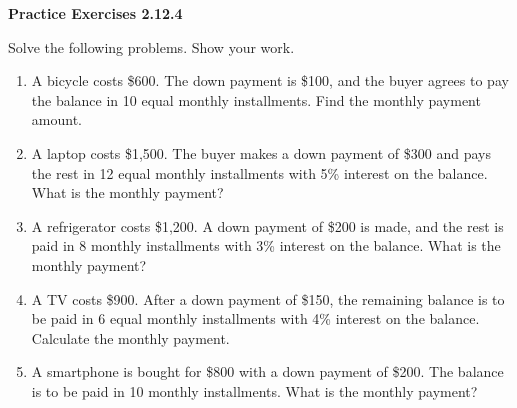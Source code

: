 \noindent\textbf{Practice Exercises 2.12.4}



Solve the following problems. Show your work.
\begin{enumerate}[noitemsep, label = \color{blue}\arabic*. ]
    \item A bicycle costs \$600. The down payment is \$100, and the buyer agrees to pay the balance in 10 equal monthly installments. Find the monthly payment amount.
    \item A laptop costs \$1,500. The buyer makes a down payment of \$300 and pays the rest in 12 equal monthly installments with 5\% interest on the balance. What is the monthly payment?
    \item A refrigerator costs \$1,200. A down payment of \$200 is made, and the rest is paid in 8 monthly installments with 3\% interest on the balance. What is the monthly payment?
    \item A TV costs \$900. After a down payment of \$150, the remaining balance is to be paid in 6 equal monthly installments with 4\% interest on the balance. Calculate the monthly payment.
    \item A smartphone is bought for \$800 with a down payment of \$200. The balance is to be paid in 10 monthly installments. What is the monthly payment?
\end{enumerate}
